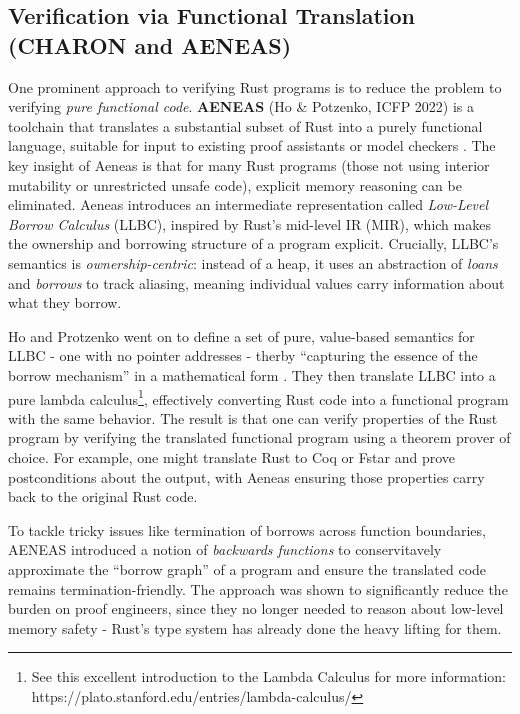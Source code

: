 \subsection{Verification via Functional Translation (CHARON and AENEAS)}
One prominent approach to verifying Rust programs is to reduce the problem to
verifying \textit{pure functional code}. \textbf{AENEAS} (Ho \& Potzenko, ICFP
2022) is a toolchain that translates a substantial subset of Rust into a purely
functional language, suitable for input to existing proof assistants or model
checkers \cite{AENEAS}. The key insight of Aeneas is that for many Rust programs
(those not using interior mutability or unrestricted unsafe code), explicit
memory reasoning can be eliminated. Aeneas introduces an intermediate
representation called \textit{Low-Level Borrow Calculus} (LLBC), inspired by
Rust's mid-level IR (MIR), which makes the ownership and borrowing structure of
a program explicit. Crucially, LLBC's semantics is \textit{ownership-centric}:
instead of a heap, it uses an abstraction of \textit{loans} and \textit{borrows}
to track aliasing, meaning individual values carry information about what they
borrow.

Ho and Protzenko went on to define a set of pure, value-based semantics for LLBC
- one with no pointer addresses - therby ``capturing the essence of the borrow
mechanism'' in a mathematical form \cite{AENEAS_PART_2}. They then translate LLBC
into a pure lambda calculus\footnote{See this excellent introduction to the
Lambda Calculus for more information: \newline
https://plato.stanford.edu/entries/lambda-calculus/}, effectively converting
Rust code into a functional
program with the same behavior. The result is that one can verify properties of
the Rust program by verifying the translated functional program using a theorem
prover of choice. For example, one might translate Rust to Coq or Fstar and
prove postconditions about the output, with Aeneas ensuring those properties
carry back to the original Rust code.

To tackle tricky issues like termination of borrows across function boundaries,
AENEAS introduced a notion of \textit{backwards functions} to conservitavely
approximate the ``borrow graph'' of a program and ensure the translated code
remains termination-friendly. The approach was shown to significantly reduce the
burden on proof engineers, since they no longer needed to reason about low-level
memory safety - Rust's type system has already done the heavy lifting for them.

